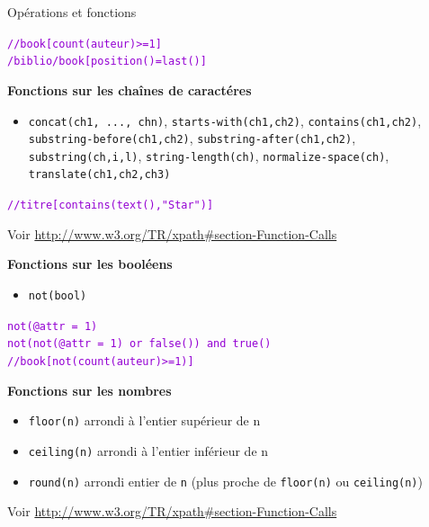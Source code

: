 \begin{frame}[allowframebreaks]{Opérations et fonctions}
\begin{flushright}
\textcolor{DarkViolet}{\verb?//book[count(auteur)>=1]?\\
\verb?/biblio/book[position()=last()]?}
\end{flushright}

\framebreak

{\bf Fonctions sur les cha\^{i}nes de caractéres}

\begin{itemize}
\item \verb?concat(ch1, ..., chn)?, \verb?starts-with(ch1,ch2)?, \verb?contains(ch1,ch2)?, \verb?substring-before(ch1,ch2)?, \verb?substring-after(ch1,ch2)?, \verb?substring(ch,i,l)?, \verb?string-length(ch)?, \verb?normalize-space(ch)?, \verb?translate(ch1,ch2,ch3)?
\end{itemize}

\begin{flushright}
\textcolor{DarkViolet}{\verb?//titre[contains(text(),"Star")]?}
\end{flushright}


Voir \url{http://www.w3.org/TR/xpath\#section-Function-Calls}


\framebreak

{\bf Fonctions sur les booléens}

\begin{itemize}
\item \verb?not(bool)?
\end{itemize}

\begin{flushright}
\textcolor{DarkViolet}{\verb?not(@attr = 1)?\\
\verb?not(not(@attr = 1) or false()) and true()?\\
\verb?//book[not(count(auteur)>=1)]?
}
\end{flushright}


\framebreak

{\bf Fonctions sur les nombres}

\begin{itemize}
\item \verb?floor(n)? arrondi à l'entier supérieur de n
\item \verb?ceiling(n)? arrondi à l'entier inférieur de n
\item \verb?round(n)? arrondi entier de \verb?n? (plus proche de \verb?floor(n)? ou \verb?ceiling(n)?)
\end{itemize}

Voir \url{http://www.w3.org/TR/xpath\#section-Function-Calls}

\end{frame}



